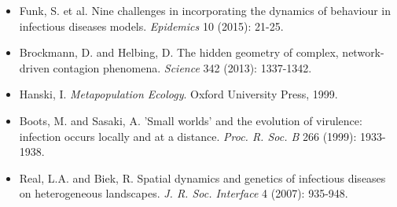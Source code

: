 \documentclass[a4paper, 11pt]{article}
\begin{document}
\begin{itemize}
\item Funk, S. et al. Nine challenges in incorporating the dynamics of behaviour in infectious diseases models. \textit{Epidemics} 10 (2015): 21-25.
\item Brockmann, D. and Helbing, D. The hidden geometry of complex, network-driven contagion phenomena. \textit{Science} 342 (2013): 1337-1342.
\item Hanski, I. \textit{Metapopulation Ecology}. Oxford University Press, 1999.
\item Boots, M. and Sasaki, A. 'Small worlds' and the evolution of virulence: infection occurs locally and at a distance. \textit{Proc. R. Soc. B} 266 (1999): 1933-1938.
\item Real, L.A. and Biek, R. Spatial dynamics and genetics of infectious diseases on heterogeneous landscapes. \textit{J. R. Soc. Interface} 4 (2007): 935-948.
\end{itemize}
\end{document}
